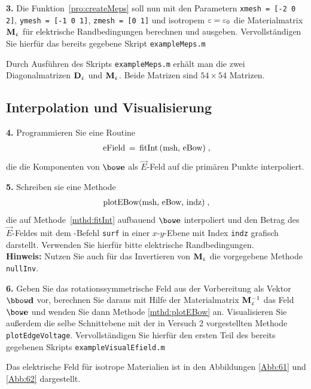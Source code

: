 \documentclass[Protokollheft.tex]{subfiles}
\begin{document}
\begin{framed}
	\noindent \textbf{3.} Die Funktion~\eqref{pro:createMeps} soll nun mit den Parametern
\lstinline{xmesh = [-2 0 2]}, \lstinline{ymesh = [-1 0 1]}, \lstinline{zmesh = [0 1]} und
isotropem $\varepsilon=\varepsilon_0$ die Materialmatrix
$\mathbf{M}_{\upvarepsilon}$ für elektrische Randbedingungen berechnen und ausgeben. Vervollständigen Sie hierfür das bereits gegebene Skript \lstinline{exampleMeps.m}\label{exer:MepsExample}
\end{framed}
\noindent
Durch Ausführen des Skripts \lstinline{exampleMeps.m} erhält man die zwei Diagonalmatrizen $\mathbf{D}_{\upvarepsilon}$ und $\mathbf{M}_{\upvarepsilon}$. Beide Matrizen sind  $54 \times 54$ Matrizen. 


\subsection{Interpolation und Visualisierung}

\begin{framed}
	\noindent \textbf{4.} Programmieren Sie eine Routine
\begin{align}
	\lstinline{eField = fitInt(msh, eBow)} \; , \label{mthd:fitInt}
\end{align}	
die die Komponenten von $\efit$ als $\vec{E}$-Feld auf die primären Punkte interpoliert.\label{exer:fitInt}
\end{framed}



\begin{framed}
	\noindent \textbf{5.} Schreiben sie eine Methode
\begin{align}
	\lstinline{plotEBow(msh, eBow, indz)} \; , \label{mthd:plotEBow}
\end{align}
die auf Methode~\eqref{mthd:fitInt} aufbauend $\efit$ interpoliert und den
Betrag des $\vec{E}$-Feldes mit dem \matlab-Befehl \lstinline{surf} in einer
$x$-$y$-Ebene mit Index \lstinline{indz} grafisch darstellt. Verwenden Sie hierfür bitte elektrische Randbedingungen.
\\
\textbf{Hinweis:} Nutzen Sie auch für das Invertieren von $\mathbf{M}_{\upvarepsilon}$ die vorgegebene Methode
\lstinline{nullInv}.\label{exer:plotEBow}
\end{framed}



\begin{framed}
	\noindent \textbf{6.} Geben Sie das rotationssymmetrische Feld aus der Vorbereitung als
Vektor $\dfit$ vor, berechnen Sie daraus mit Hilfe der Materialmatrix $\mathbf{M}_{\upvarepsilon}^{-1}$
das Feld $\efit$ und wenden Sie dann Methode \eqref{mthd:plotEBow} an. Visualisieren Sie außerdem die selbe Schnittebene mit der in Versuch 2 vorgestellten Methode \lstinline{plotEdgeVoltage}. Vervollständigen Sie hierfür den ersten Teil des bereits gegebenen Skripts \lstinline{exampleVisualEfield.m}\label{exer:exampleVisualEfield1}
\end{framed}
\noindent
Das elektrische Feld für isotrope Materialien ist in den Abbildungen \ref{Abb:61} und \ref{Abb:62} dargestellt.
\end{document}
